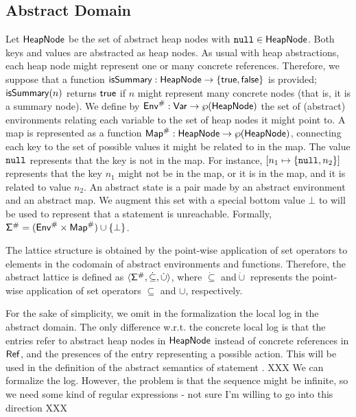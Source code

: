 \subsection{Abstract Domain}
\label{sect:abstractate}

Let $\mathsf{HeapNode}$ be the set of abstract heap nodes with $\mathtt{null} \in \mathsf{HeapNode}$. Both keys and values are abstracted as heap nodes. As usual with heap abstractions, each heap node might represent one or many concrete references. Therefore, we suppose that a function $\mathsf{isSummary} : \mathsf{HeapNode} \to \{\mathsf{true}, \mathsf{false}\}$ is provided; $\mathsf{isSummary}(n)$ returns $\mathsf{true}$ if $n$ might represent many concrete nodes (that is, it is a summary node). We define by $\mathsf{Env}^\# : \mathsf{Var} \to \wp(\mathsf{HeapNode})$ the set of (abstract) environments relating each variable to the set of heap nodes it might point to. A map is represented as a function $\mathsf{Map}^\# : \mathsf{HeapNode} \to \wp(\mathsf{HeapNode})$, connecting each key to the set of possible values it might be related to in the map. The value $\mathtt{null}$ represents that the key is not in the map. For instance, $[n_1 \mapsto \{\mathtt{null}, n_2\}]$ represents that the key $n_1$ might not be in the map, or it is in the map, and it is related to value $n_2$. An abstract state is a pair made by an abstract environment and an abstract map. We augment this set with a special bottom value $\bot$ to will be used to represent that a statement is unreachable. Formally, $\mathsf{\Sigma}^\# = (\mathsf{Env}^\# \times \mathsf{Map}^\#) \cup \{\bot\}$.

The lattice structure is obtained by the point-wise application of set operators to elements in the codomain of abstract environments and functions. Therefore, the abstract lattice is defined as $\langle \mathsf{\Sigma}^\#, \dot{\subseteq}, \dot{\cup} \rangle$, where $\dot{\subseteq}$ and$\dot{\cup}$ represents the point-wise application of set operators $\subseteq$ and $\cup$, respectively.

For the sake of simplicity, we omit in the formalization the local log in the abstract domain. The only difference w.r.t. the concrete local log is that the entries refer to abstract heap nodes in $\mathsf{HeapNode}$ instead of concrete references in $\mathsf{Ref}$, and the presences of the entry  representing a possible  action. This will be used in the definition of the abstract semantics of statement . XXX We can formalize the log. However, the problem is that the sequence might be infinite, so we need some kind of regular expressions - not sure I'm willing to go into this direction XXX 

